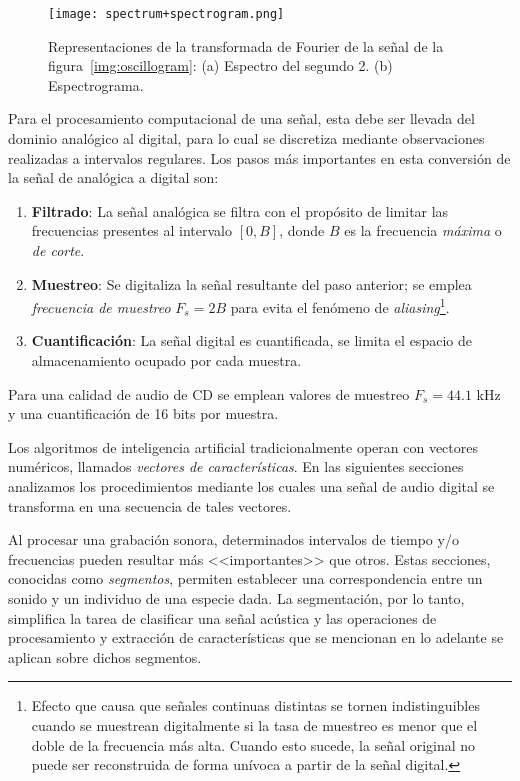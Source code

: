 \begin{figure}[!h]
    \centering
    \texttt{[image: spectrum+spectrogram.png]}
    \caption{Representaciones de la transformada de Fourier de la señal de la figura~\ref{img:oscillogram}: (a) Espectro del segundo 2. (b) Espectrograma.}
    \label{img:spectrum+spectrogram}
\end{figure}

Para el procesamiento computacional de una señal, esta debe ser llevada del dominio analógico al digital, para lo cual se discretiza mediante observaciones realizadas a intervalos regulares.
Los pasos más importantes en esta conversión de la señal de analógica a digital son:

\begin{enumerate}
    \item \textbf{Filtrado}: La señal analógica se filtra con el propósito de limitar las frecuencias presentes al intervalo $[0,B]$, donde $B$ es la frecuencia \textit{máxima} o \textit{de corte}.
    \item \textbf{Muestreo}: Se digitaliza la señal resultante del paso anterior;
    se emplea \textit{frecuencia de muestreo} $F_s = 2B$ para evita el fenómeno de \textit{aliasing}\footnote{Efecto que causa que señales continuas distintas se tornen indistinguibles cuando se muestrean digitalmente si la tasa de muestreo es menor que el doble de la frecuencia más alta.
    Cuando esto sucede, la señal original no puede ser reconstruida de forma unívoca a partir de la señal digital.}.
    \item \textbf{Cuantificación}: La señal digital es cuantificada, se limita el espacio de almacenamiento ocupado por cada muestra.
\end{enumerate}

Para una calidad de audio de CD se emplean valores de muestreo $F_s = 44.1$ kHz y una cuantificación de 16 bits por muestra.

Los algoritmos de inteligencia artificial tradicionalmente operan con vectores numéricos, llamados \textit{vectores de características}.
En las siguientes secciones analizamos los procedimientos mediante los cuales una señal de audio digital se transforma en una secuencia de tales vectores.

Al procesar una grabación sonora, determinados intervalos de tiempo y/o frecuencias pueden resultar más <<importantes>> que otros.
Estas secciones, conocidas como \textit{segmentos}, permiten establecer una correspondencia entre un sonido y un individuo de una especie dada.
La segmentación, por lo tanto, simplifica la tarea de clasificar una señal acústica y las operaciones de procesamiento y extracción de características que se mencionan en lo adelante se aplican sobre dichos segmentos.

